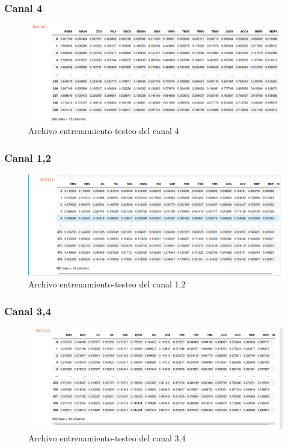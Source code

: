         
        \subsubsection{Canal 4}
        \begin{figure}[ht]
            \centering
            \includegraphics[scale=0.4]{imagenes/datos canal 4.png}
            \caption{Archivo entrenamiento-testeo del canal 4}
            \label{fig:archivo4}
        \end{figure}
        
        \newpage
        \subsubsection{Canal 1,2}
        \begin{figure}[ht]
            \centering
            \includegraphics[scale=0.4]{imagenes/datos canal12.png}
            \caption{Archivo entrenamiento-testeo del canal 1,2}
            \label{fig:archivo12}
        \end{figure}
        
      
        \subsubsection{Canal 3,4}
        \begin{figure}[ht]
            \centering
            \includegraphics[scale=0.4]{imagenes/datos canal 34.png}
            \caption{Archivo entrenamiento-testeo del canal 3,4}
            \label{fig:archivo34}
        \end{figure}
        

